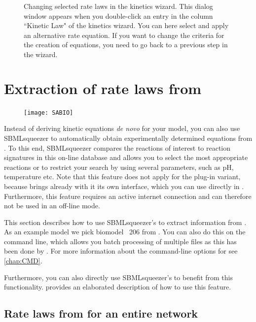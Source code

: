 \begin{figure}
\caption[Changing selected rate laws in the kinetics wizard]{Changing selected rate laws in the kinetics wizard.
This dialog window appears when you double-click an entry in the column ``Kinetic Law" of the kinetics wizard.
You can here select and apply an alternative rate equation.
If you want to change the criteria for the creation of equations, you need to go back to a previous step in the wizard.}
\label{fig:ChangingLawsInWizard}
\end{figure}

\section{Extraction of rate laws from \SABIO}

\begin{figure}
\vspace{\wrapfigspace}
\texttt{[image: SABIO]}
\end{figure}
Instead of deriving kinetic equations \emph{de novo} for your model, you can also use SBMLsqueezer to automatically obtain experimentally determined equations from \SABIO.
To this end, SBMLsqueezer compares the reactions of interest to reaction signatures in this on-line database and allows you to select the most appropriate reactions or to restrict your search by using several parameters, such as pH, temperature etc.
Note that this feature does not apply for the \CellDesigner plug-in variant,
because \CellDesigner brings already with it its own \SABIO interface, which you can use directly in \CellDesigner.
Furthermore, this feature requires an active internet connection and can therefore not be used in an off-line mode.

This section describes how to use SBMLsqueezer's \GUI to extract information from \SABIO.
As an example model we pick biomodel \numero~206 from \BioModels \citep{Li2010a}.
You can also do this on the command line, which allows you batch processing of multiple \SBML files as this has been done by \citet{Buechel2013}.
For more information about the command-line options for \SABIO see \vref{chap:CMD}.

Furthermore, you can also directly use SBMLsqueezer's \API to benefit from this functionality.  provides an elaborated description of how to use this feature.

\subsection{Rate laws from \SABIO for an entire network}

